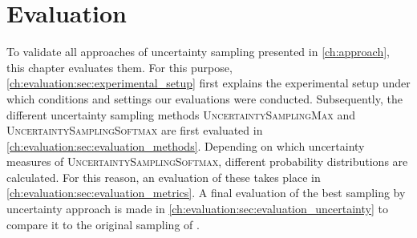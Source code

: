 \chapter{Evaluation}
\label{ch:evaluation}
To validate all approaches of uncertainty sampling presented in \autoref{ch:approach}, this chapter evaluates them.
For this purpose, \autoref{ch:evaluation:sec:experimental_setup} first explains the experimental setup under which conditions and settings our evaluations were conducted.
Subsequently, the different uncertainty sampling methods \textsc{UncertaintySamplingMax} and \textsc{UncertaintySamplingSoftmax} are first evaluated in \autoref{ch:evaluation:sec:evaluation_methods}.
Depending on which uncertainty measures of \textsc{UncertaintySamplingSoftmax}, different probability distributions are calculated.
For this reason, an evaluation of these takes place in \autoref{ch:evaluation:sec:evaluation_metrics}.
A final evaluation of the best sampling by uncertainty approach is made in \autoref{ch:evaluation:sec:evaluation_uncertainty} to compare it to the original sampling of \kbgan.








